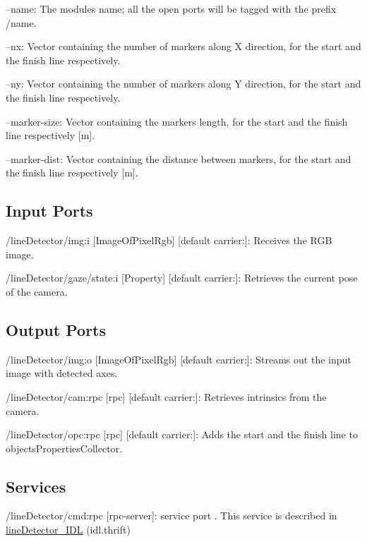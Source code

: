 \begin{DoxyItemize}
\item --name\+: The module\textquotesingle{}s name; all the open ports will be tagged with the prefix /name.
\item --nx\+: Vector containing the number of markers along X direction, for the start and the finish line respectively.
\item --ny\+: Vector containing the number of markers along Y direction, for the start and the finish line respectively.
\item --marker-\/size\+: Vector containing the marker\textquotesingle{}s length, for the start and the finish line respectively \mbox{[}m\mbox{]}.
\item --marker-\/dist\+: Vector containing the distance between markers, for the start and the finish line respectively \mbox{[}m\mbox{]}. 
\end{DoxyItemize}\hypertarget{group__skeletonViewer_inputports_sec}{}\subsection{Input Ports}\label{group__skeletonViewer_inputports_sec}

\begin{DoxyItemize}
\item /line\+Detector/img\+:i \mbox{[}Image\+Of\+Pixel\+Rgb\mbox{]} \mbox{[}default carrier\+:\mbox{]}\+: Receives the R\+GB image.
\item /line\+Detector/gaze/state\+:i \mbox{[}Property\mbox{]} \mbox{[}default carrier\+:\mbox{]}\+: Retrieves the current pose of the camera.
\end{DoxyItemize}\hypertarget{group__skeletonViewer_outputports_sec}{}\subsection{Output Ports}\label{group__skeletonViewer_outputports_sec}

\begin{DoxyItemize}
\item /line\+Detector/img\+:o \mbox{[}Image\+Of\+Pixel\+Rgb\mbox{]} \mbox{[}default carrier\+:\mbox{]}\+: Streams out the input image with detected axes.
\item /line\+Detector/cam\+:rpc \mbox{[}rpc\mbox{]} \mbox{[}default carrier\+:\mbox{]}\+: Retrieves intrinsics from the camera.
\item /line\+Detector/opc\+:rpc \mbox{[}rpc\mbox{]} \mbox{[}default carrier\+:\mbox{]}\+: Adds the start and the finish line to objects\+Properties\+Collector.
\end{DoxyItemize}\hypertarget{group__skeletonViewer_services_sec}{}\subsection{Services}\label{group__skeletonViewer_services_sec}

\begin{DoxyItemize}
\item /line\+Detector/cmd\+:rpc \mbox{[}rpc-\/server\mbox{]}\+: service port . This service is described in \mbox{\hyperlink{classlineDetector__IDL}{line\+Detector\+\_\+\+I\+DL}} (idl.\+thrift) 
\end{DoxyItemize}